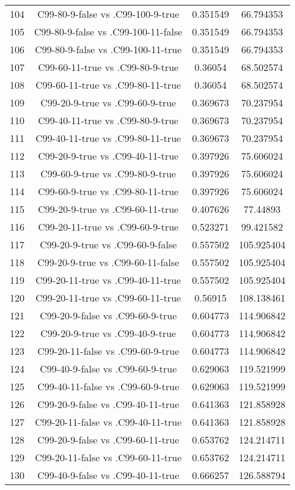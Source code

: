 \documentclass[a4paper,10pt]{article}
\begin{document}
\begin{landscape}
\begin{table}[!htp]
\begin{tabular}{cccc}
104&C99-80-9-false vs .C99-100-9-true&0.351549&66.794353\\
105&C99-80-9-false vs .C99-100-11-false&0.351549&66.794353\\
106&C99-80-9-false vs .C99-100-11-true&0.351549&66.794353\\
107&C99-60-11-true vs .C99-80-9-true&0.36054&68.502574\\
108&C99-60-11-true vs .C99-80-11-true&0.36054&68.502574\\
109&C99-20-9-true vs .C99-60-9-true&0.369673&70.237954\\
110&C99-40-11-true vs .C99-80-9-true&0.369673&70.237954\\
111&C99-40-11-true vs .C99-80-11-true&0.369673&70.237954\\
112&C99-20-9-true vs .C99-40-11-true&0.397926&75.606024\\
113&C99-60-9-true vs .C99-80-9-true&0.397926&75.606024\\
114&C99-60-9-true vs .C99-80-11-true&0.397926&75.606024\\
115&C99-20-9-true vs .C99-60-11-true&0.407626&77.44893\\
116&C99-20-11-true vs .C99-60-9-true&0.523271&99.421582\\
117&C99-20-9-true vs .C99-60-9-false&0.557502&105.925404\\
118&C99-20-9-true vs .C99-60-11-false&0.557502&105.925404\\
119&C99-20-11-true vs .C99-40-11-true&0.557502&105.925404\\
120&C99-20-11-true vs .C99-60-11-true&0.56915&108.138461\\
121&C99-20-9-false vs .C99-60-9-true&0.604773&114.906842\\
122&C99-20-9-true vs .C99-40-9-true&0.604773&114.906842\\
123&C99-20-11-false vs .C99-60-9-true&0.604773&114.906842\\
124&C99-40-9-false vs .C99-60-9-true&0.629063&119.521999\\
125&C99-40-11-false vs .C99-60-9-true&0.629063&119.521999\\
126&C99-20-9-false vs .C99-40-11-true&0.641363&121.858928\\
127&C99-20-11-false vs .C99-40-11-true&0.641363&121.858928\\
128&C99-20-9-false vs .C99-60-11-true&0.653762&124.214711\\
129&C99-20-11-false vs .C99-60-11-true&0.653762&124.214711\\
130&C99-40-9-false vs .C99-40-11-true&0.666257&126.588794\\

\end{tabular}
\end{table}
\end{landscape}
\end{document}
